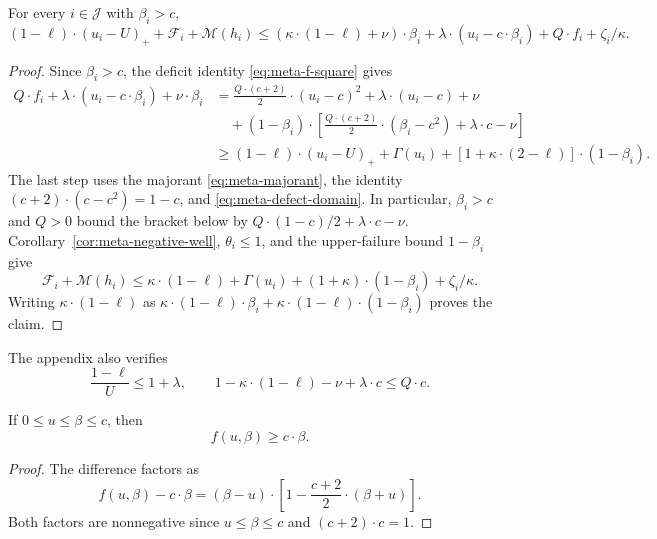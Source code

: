 \begin{lemma}
\label{lem:meta-good-charge}
For every $i\in\mathcal J$ with $\beta_i>c$,
\begin{equation}
 (1-\ell)\cdot(u_i-U)_++\mathcal F_i+\mathcal M(h_i)
 \le (\kappa\cdot(1-\ell)+\nu)\cdot\beta_i+\lambda\cdot(u_i-c\cdot\beta_i)
       +Q\cdot f_i+\zeta_i/\kappa.
 \label{eq:meta-good-complete}
\end{equation}
\end{lemma}
\begin{proof}
Since $\beta_i>c$, the deficit identity \eqref{eq:meta-f-square} gives
\begin{align*}
 Q\cdot f_i+\lambda\cdot(u_i-c\cdot\beta_i)+\nu\cdot\beta_i
 &=\frac{Q\cdot (c+2)}{2}\cdot(u_i-c)^2+\lambda\cdot(u_i-c)+\nu\\
 &\quad +(1-\beta_i)\cdot
   \left[\frac{Q\cdot (c+2)}{2}\cdot(\beta_i-c^2)+\lambda\cdot c-\nu\right]\\
 &\ge (1-\ell)\cdot(u_i-U)_++\Gamma(u_i)+[1+\kappa\cdot(2-\ell)]\cdot(1-\beta_i).
\end{align*}
The last step uses the majorant \eqref{eq:meta-majorant}, the identity
$(c+2)\cdot(c-c^2)=1-c$, and \eqref{eq:meta-defect-domain}. In particular,
$\beta_i>c$ and $Q>0$ bound the bracket below by
$Q\cdot(1-c)/2+\lambda\cdot c-\nu$.
Corollary~\ref{cor:meta-negative-well}, $\theta_i\le1$, and the upper-failure
bound $1-\beta_i$ give
\[
 \mathcal F_i+\mathcal M(h_i)\le
 \kappa\cdot(1-\ell)+\Gamma(u_i)+(1+\kappa)\cdot(1-\beta_i)+\zeta_i/\kappa.
\]
Writing $\kappa\cdot(1-\ell)$ as
$\kappa\cdot(1-\ell)\cdot\beta_i+\kappa\cdot(1-\ell)\cdot(1-\beta_i)$ proves the claim.
\end{proof}

The appendix also verifies
\begin{equation}
 \frac{1-\ell}{U}\le1+\lambda,\qquad
 1-\kappa\cdot(1-\ell)-\nu+\lambda\cdot c
 \le Q\cdot c.
 \label{eq:meta-low-parameters}
\end{equation}

\begin{lemma}
\label{lem:low-crossing-deficit}
If $0\le u\le\beta\le c$, then
\[
 f(u,\beta)\ge c\cdot\beta.
\]
\end{lemma}
\begin{proof}
The difference factors as
\[
 f(u,\beta)-c\cdot\beta
 =(\beta-u)\cdot\left[1-\frac{c+2}{2}\cdot(\beta+u)\right].
\]
Both factors are nonnegative since $u\le\beta\le c$ and
$(c+2)\cdot c=1$.
\end{proof}

